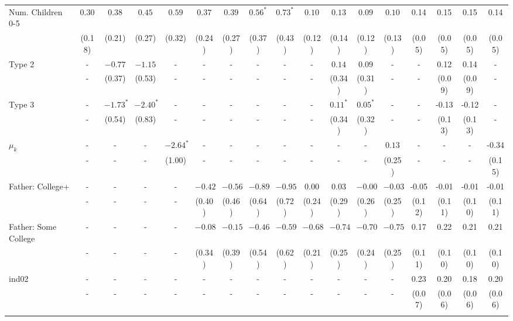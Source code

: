 \begin{tabular}{lcccccccccccccccc}
Num. Children 0-5&$0.30$&$0.38$&$0.45$&$0.59$&$0.37$&$0.39$&$0.56^{*}$&$0.73^{*}$&$0.10$&$0.13$&$0.09$&$0.10$&0.14&0.15&0.15&0.14\\
&(0.18)&(0.21)&(0.27)&(0.32)&(0.24)&(0.27)&(0.37)&(0.43)&(0.12)&(0.14)&(0.12)&(0.13)&(0.05)&(0.05)&(0.05)&(0.05)\\
Type 2&-&$-0.77$&$-1.15$&-&-&-&-&-&-&$0.14$&$0.09$&-&-&0.12&0.14&-\\
&-&(0.37)&(0.53)&-&-&-&-&-&-&(0.34)&(0.31)&-&-&(0.09)&(0.09)&-\\
Type 3&-&$-1.73^{*}$&$-2.40^{*}$&-&-&-&-&-&-&$0.11^{*}$&$0.05^{*}$&-&-&-0.13&-0.12&-\\
&-&(0.54)&(0.83)&-&-&-&-&-&-&(0.34)&(0.32)&-&-&(0.13)&(0.13)&-\\
$\mu_{k}$&-&-&-&$-2.64^{*}$&-&-&-&-&-&-&-&$0.13$&-&-&-&-0.34\\
&-&-&-&(1.00)&-&-&-&-&-&-&-&(0.25)&-&-&-&(0.15)\\
Father: College+&-&-&-&-&$-0.42$&$-0.56$&$-0.89$&$-0.95$&$0.00$&$0.03$&$-0.00$&$-0.03$&-0.05&-0.01&-0.01&-0.01\\
&-&-&-&-&(0.40)&(0.46)&(0.64)&(0.72)&(0.24)&(0.29)&(0.26)&(0.25)&(0.12)&(0.11)&(0.10)&(0.11)\\
Father: Some College&-&-&-&-&$-0.08$&$-0.15$&$-0.46$&$-0.59$&$-0.68$&$-0.74$&$-0.70$&$-0.75$&0.17&0.22&0.21&0.21\\
&-&-&-&-&(0.34)&(0.39)&(0.54)&(0.62)&(0.21)&(0.25)&(0.24)&(0.25)&(0.11)&(0.10)&(0.10)&(0.10)\\
ind02&-&-&-&-&-&-&-&-&-&-&-&-&0.23&0.20&0.18&0.20\\
&-&-&-&-&-&-&-&-&-&-&-&-&(0.07)&(0.06)&(0.06)&(0.06)\\
\\
\bottomrule\end{tabular}